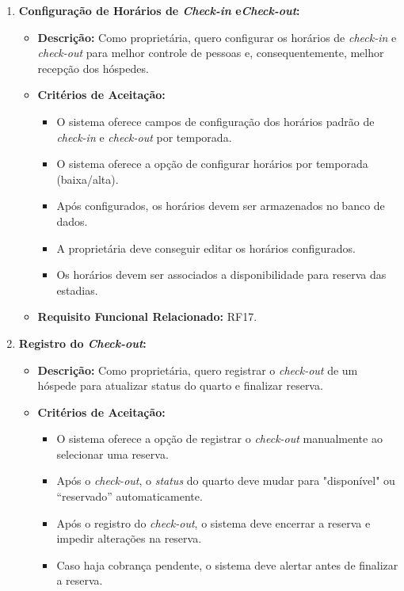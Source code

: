 \documentclass[
	12pt,				%
	openany,			%
	oneside,			%
	a4paper,			%
	english,			%
	french,				%
	spanish,			%
	brazil				%
	]{abntex2}
\begin{document}
\begin{enumerate}[label=\textbf{\arabic*.}]
\begin{itemize}
	\end{itemize} 
	\item \textbf{Configuração de Horários de \textit{Check-in} e\textit{Check-out}:}
	\begin{itemize}
		\item \textbf{Descrição:}  Como proprietária, quero configurar os horários de \textit{check-in} e \textit{check-out} para melhor controle de pessoas e, consequentemente, melhor recepção dos hóspedes.
		\item \textbf{Critérios de Aceitação:}
		\begin{itemize}
			\item O sistema oferece campos de configuração dos horários padrão de \textit{check-in} e \textit{check-out} por temporada.
			\item O sistema oferece a opção de configurar horários por temporada (baixa/alta). 
			\item Após configurados, os horários devem ser armazenados no banco de dados.
			\item A proprietária deve conseguir editar os horários configurados.
			\item Os horários devem ser associados a disponibilidade para reserva das estadias.
		\end{itemize}
		\item \textbf{Requisito Funcional Relacionado:} RF17.
	\end{itemize} 
	\item \textbf{Registro do \textit{Check-out}:}
	\begin{itemize}
		\item \textbf{Descrição:}  Como proprietária, quero registrar o \textit{check-out} de um hóspede para atualizar status do quarto e finalizar reserva.
		\item \textbf{Critérios de Aceitação:}
		\begin{itemize}
			\item O sistema oferece a opção de registrar o \textit{check-out} manualmente ao selecionar uma reserva.
			\item Após o \textit{check-out}, o \textit{status} do quarto deve mudar para "disponível" ou “reservado” automaticamente.
			\item Após o registro do \textit{check-out}, o sistema deve encerrar a reserva e impedir alterações na reserva.
			\item Caso haja cobrança pendente, o sistema deve alertar antes de finalizar a reserva.
		\end{itemize}

\end{itemize}
\end{enumerate}
\end{document}
